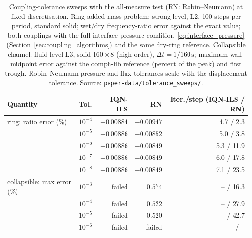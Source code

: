 \begin{table}[htbp]
	\centering
	\small
	\caption{Coupling-tolerance sweeps with the all-measure test (RN: Robin--Neumann) at fixed discretisation. Ring added-mass problem: strong level, L2, 100 steps per period, standard solid; wet/dry frequency-ratio error against the exact value; both couplings with the full interface pressure condition~\eqref{eq:interface_pressure} (Section~\ref{sec:coupling_algorithms}) and the same dry-ring reference. Collapsible channel: fluid level L3, solid $160\times8$ (high order), $\Delta t = 1/160\,\mathrm{s}$; maximum wall-midpoint error against the oomph-lib reference (percent of the peak) and first trough. Robin--Neumann pressure and flux tolerances scale with the displacement tolerance. Source: \texttt{paper-data/tolerance\_sweeps/}.}
	\label{tab:tol_sweeps}
	\setlength{\tabcolsep}{4pt}
	\begin{tabular}{llrrr}
		\toprule
		Quantity & Tol. & IQN-ILS & RN & Iter./step (IQN-ILS / RN) \\
		\midrule
		ring: ratio error (\%) & $10^{-4}$ & $-0.00884$ & $-0.00947$ & 4.7 / 2.3 \\
		 & $10^{-5}$ & $-0.00886$ & $-0.00852$ & 5.0 / 3.8 \\
		 & $10^{-6}$ & $-0.00886$ & $-0.00849$ & 5.3 / 11.9 \\
		 & $10^{-7}$ & $-0.00886$ & $-0.00849$ & 6.0 / 17.8 \\
		 & $10^{-8}$ & $-0.00886$ & $-0.00849$ & 7.1 / 23.5 \\
		\midrule
		collapsible: max error (\%) & $10^{-3}$ & failed & $0.574$ & -- / 16.3 \\
		 & $10^{-4}$ & failed & $0.522$ & -- / 27.9 \\
		 & $10^{-5}$ & failed & $0.520$ & -- / 42.7 \\
		 & $10^{-6}$ & failed & failed & -- / -- \\
		\bottomrule
	\end{tabular}
\end{table}

